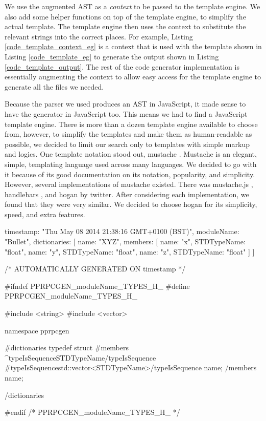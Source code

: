 We use the augmented AST as a \emph{context} to be passed to the template engine. We also add some helper functions on top of the template engine, to simplify the actual template. The template engine then uses the context to substitute the relevant strings into the correct places. For example, Listing \ref{code_template_context_eg} is a context that is used with the template shown in Listing \ref{code_template_eg} to generate the output shown in Listing \ref{code_template_output}. The rest of the code generator implementation is essentially augmenting the context to allow easy access for the template engine to generate all the files we needed.

Because the parser we used produces an AST in JavaScript, it made sense to have the generator in JavaScript too. This means we had to find a JavaScript template engine. There is more than a dozen template engine available to choose from, however, to simplify the templates and make them as human-readable as possible, we decided to limit our search only to templates with simple markup and logics. One template notation stood out, mustache \cite{mustache}. Mustache is an elegant, simple, templating language used across many languages. We decided to go with it because of its good documentation on its notation, popularity, and simplicity. However, several implementations of mustache existed. There was mustache.js \cite{mustachejs}, handlebars \cite{handlebarsjs}, and hogan \cite{hoganjs} by twitter. After considering each implementation, we found that they were very similar. We decided to choose hogan for its simplicity, speed, and extra features.

\begin{code}
{
  timestamp: "Thu May 08 2014 21:38:16 GMT+0100 (BST)",
  moduleName: "Bullet",
  dictionaries: [{
    name: "XYZ",
    members: [
      { name: "x", STDTypeName: "float"},
      { name: "y", STDTypeName: "float"},
      { name: "z", STDTypeName: "float"}
    ]
  }]
}
\end{code}

\begin{code}
/* AUTOMATICALLY GENERATED ON {{timestamp}} */

#ifndef PPRPCGEN_{{moduleName}}_TYPES_H_
#define PPRPCGEN_{{moduleName}}_TYPES_H_

#include <string>
#include <vector>

namespace pprpcgen{
{{#dictionaries}}
typedef struct {
  {{#members}}
  {{^typeIsSequence}}{{STDTypeName}}{{/typeIsSequence}}
  {{#typeIsSequence}}std::vector<{{STDTypeName}}>{{/typeIsSequence}}
  {{name}};
  {{/members}}
} {{name}};

{{/dictionaries}}

}

#endif /* PPRPCGEN_{{moduleName}}_TYPES_H_ */

\end{code}

